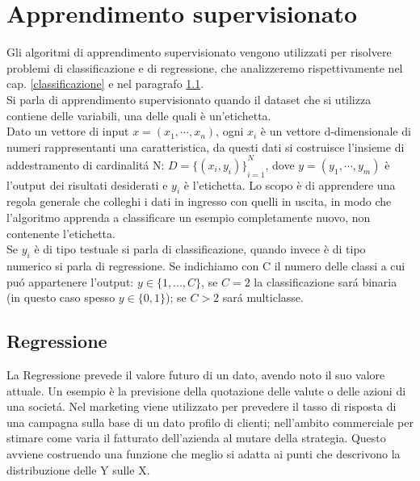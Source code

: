 \documentclass[a4paper,12pt,oneside]{book}
\begin{document}
\section{Apprendimento supervisionato}
Gli algoritmi di apprendimento supervisionato vengono utilizzati per risolvere problemi di classificazione e di regressione, che analizzeremo rispettivamente nel cap. \ref{classificazione} e nel paragrafo \ref{regressione}.\\
Si parla di apprendimento supervisionato quando il dataset che si utilizza contiene delle variabili, una delle quali \`e un'etichetta.\\
Dato un vettore di input $x=(x_{1},\cdots,x_{n})$, ogni $x_{i}$ \`e un vettore d-dimensionale di numeri rappresentanti una caratteristica, da questi dati si costruisce l'insieme di addestramento di cardinalit\'{a} N: $D={\{ (x_{i},y_{i})\}}^{N}_{i=1}$, dove $y=(y_{1},\cdots,y_{m})$ \`e l'output dei risultati desiderati e $y_{i}$ \`e l'etichetta.
Lo scopo \`e di apprendere una regola generale che colleghi i dati in ingresso con quelli in uscita, in modo che l'algoritmo apprenda a classificare un esempio completamente nuovo, non contenente l'etichetta.\\
Se $y_{i}$ \`e di tipo testuale si parla di classificazione, quando invece \`e di tipo numerico si parla di regressione. Se indichiamo con C il numero delle classi a cui pu\'{o} appartenere l'output: $y\in \{1,...,C\}$, se $C=2$ la classificazione sar\'{a} binaria (in questo caso spesso $y\in \{0,1\}$); se $C>2$ sar\'{a} multiclasse.\\

\subsection{Regressione}\label{regressione}
La Regressione prevede il valore futuro di un dato, avendo noto il suo valore attuale. Un esempio \`e la previsione della quotazione delle valute o delle azioni di una societ\'{a}. Nel marketing viene utilizzato per prevedere il tasso di risposta di una campagna sulla base di un dato profilo di clienti; nell'ambito commerciale per stimare come varia il fatturato dell'azienda al mutare della strategia. Questo avviene costruendo una funzione che meglio si adatta ai
punti che descrivono la distribuzione delle Y sulle X. 
\end{document}
